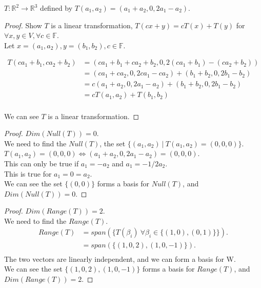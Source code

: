 \documentclass[12pt]{article}
\newenvironment{exercise}[2][Exercise]{\begin{trivlist}
\item[\hskip \labelsep{\bfseries #1}\hskip \labelsep{\bfseries #2.}]}{\end{trivlist}}
\begin{document}
\begin{exercise}{2.1.3} $T: \mathbb{R}^2 \to \mathbb{R}^3$ defined by $T(a_1, a_2) = (a_1 + a_2, 0, 2a_1 - a_2)$.

    \begin{proof} Show $T$ is a linear transformation, $T(cx + y) = cT(x) + T(y)$ for $\forall x, y \in V, \forall c \in \mathbb{F}$. \\

        \noindent Let $x = (a_1, a_2), y = (b_1, b_2), c \in \mathbb{F}$.

        \begin{align*}
            T (ca_1 + b_1, ca_2 + b_2) 
            & = (ca_1 + b_1 + ca_2 + b_2, 0, 2(ca_1 + b_1) - (ca_2 + b_2)) \\
            & = (ca_1 + ca_2, 0, 2ca_1 - ca_2) + (b_1 + b_2, 0, 2b_1 - b_2) \\
            & = c(a_1 + a_2, 0, 2a_1 - a_2) + (b_1 + b_2, 0, 2b_1 - b_2) \\
            & = c T(a_1, a_2) + T(b_1, b_2) \\
        \end{align*}

        \noindent We can see $T$ is a linear transformation.

    \end{proof}

    \begin{proof} $Dim(Null(T)) = 0$. \\

        \noindent We need to find the $Null(T)$, the set $\{(a_1, a_2)\ |\ T(a_1, a_2) = (0, 0, 0)\}$. \\
        $T(a_1, a_2) = (0, 0, 0) \iff (a_1 + a_2, 0, 2a_1 - a_2) = (0, 0, 0)$. \\
        This can only be true if $a_1 = -a_2$ and $a_1 = -1/2 a_2$. \\
        This is true for $a_1 = 0 = a_2$. \\
        We can see the set $\{(0, 0)\}$ forms a basis for $Null(T)$, and $Dim(Null(T)) = 0$.

    \end{proof}

    \begin{proof} $Dim(Range(T)) = 2$. \\

        \noindent We need to find the $Range(T)$. \\
        \noindent
        \begin{align*}
        Range(T) 
            &= span(\{T(\beta_i)\ \forall \beta_i \in \{(1, 0), (0, 1)\}\}). \\
            &= span(\{(1, 0, 2), (1, 0, -1)\}). \\
        \end{align*}
        The two vectors are linearly independent, and we can form a basis for W. \\
        We can see the set $\{(1, 0, 2), (1, 0, -1)\}$ forms a basis for $Range(T)$, and $Dim(Range(T)) = 2$.


\end{proof}
\end{exercise}
\end{document}
